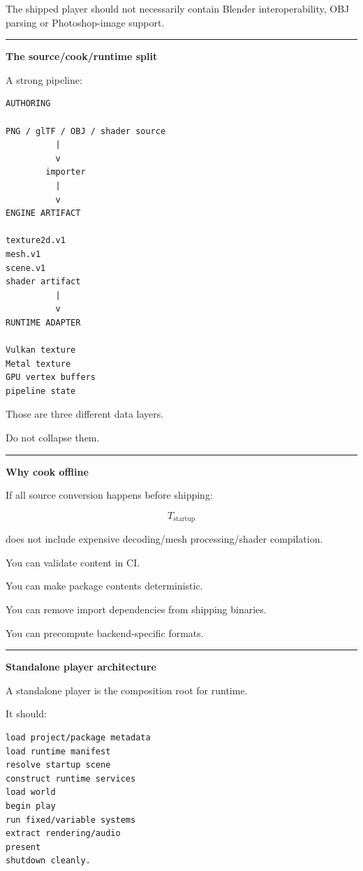 The shipped player should not necessarily contain Blender interoperability, OBJ parsing or Photoshop-image support.

\begin{center}\rule{0.5\linewidth}{0.5pt}\end{center}

\textbf{The source/cook/runtime split}

A strong pipeline:

\begin{verbatim}
AUTHORING

PNG / glTF / OBJ / shader source
          |
          v
        importer
          |
          v
ENGINE ARTIFACT

texture2d.v1
mesh.v1
scene.v1
shader artifact
          |
          v
RUNTIME ADAPTER

Vulkan texture
Metal texture
GPU vertex buffers
pipeline state
\end{verbatim}

Those are three different data layers.

Do not collapse them.

\begin{center}\rule{0.5\linewidth}{0.5pt}\end{center}

\textbf{Why cook offline}

If all source conversion happens before shipping:

\[
T_{\text{startup}}
\]

does not include expensive decoding/mesh processing/shader compilation.

You can validate content in CI.

You can make package contents deterministic.

You can remove import dependencies from shipping binaries.

You can precompute backend-specific formats.

\begin{center}\rule{0.5\linewidth}{0.5pt}\end{center}

\textbf{Standalone player architecture}

A standalone player is the composition root for runtime.

It should:

\begin{verbatim}
load project/package metadata
load runtime manifest
resolve startup scene
construct runtime services
load world
begin play
run fixed/variable systems
extract rendering/audio
present
shutdown cleanly.
\end{verbatim}

